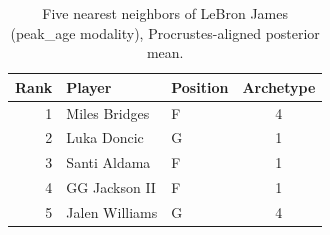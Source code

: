 \begin{table}[htbp]
  \centering\small
  \begin{tabular}{rllc}
    \toprule
    Rank & Player & Position & Archetype \\
    \midrule
    1 & Miles Bridges & F & 4 \\
    2 & Luka Doncic & G & 1 \\
    3 & Santi Aldama & F & 1 \\
    4 & GG Jackson II & F & 1 \\
    5 & Jalen Williams & G & 4 \\
    \bottomrule
  \end{tabular}
  \caption{Five nearest neighbors of LeBron James (peak_age modality), Procrustes-aligned posterior mean.}
  \label{tab:LeBron_James_neighbors_peak_age}
\end{table}

